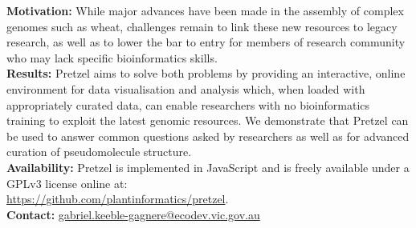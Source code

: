 \textbf{Motivation:}
While major advances have been made in the assembly of complex genomes such as wheat, challenges remain to link these new resources to legacy research, as well as to lower the bar to entry for members of research community who may lack specific bioinformatics skills. 
\\
\textbf{Results:} 
Pretzel aims to solve both problems by providing an interactive, online environment for data visualisation and analysis which, when loaded with appropriately curated data, can enable researchers with no bioinformatics training to exploit the latest genomic resources. 
We demonstrate that Pretzel can be used to answer common questions asked by researchers as well as for advanced curation of pseudomolecule structure.
\\
\textbf{Availability:} 
Pretzel is implemented in JavaScript and is freely available under a GPLv3 license online at: 
\\
\href{https://github.com/plantinformatics/pretzel}{https://github.com/plantinformatics/pretzel}.
\\
\textbf{Contact:}
\href{gabriel.keeble-gagnere@ecodev.vic.gov.au}{gabriel.keeble-gagnere@ecodev.vic.gov.au}\\
